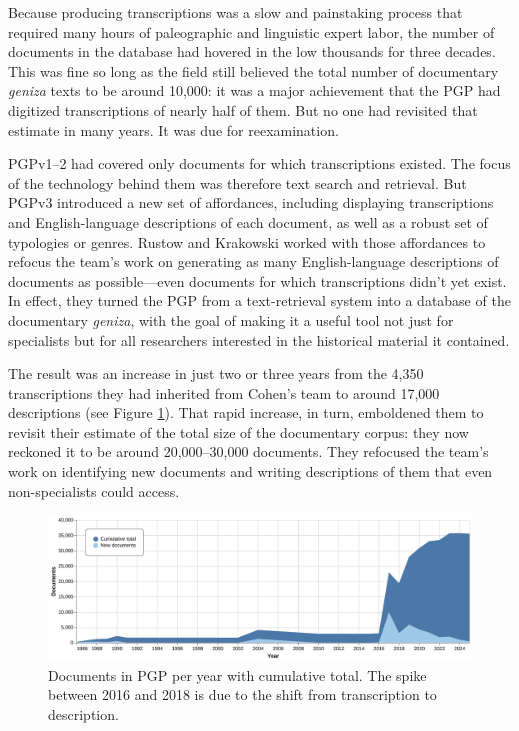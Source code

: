 \documentclass{article}
\begin{document}
Because producing transcriptions was a slow and painstaking process that required many hours of paleographic and linguistic expert labor, the number of documents in the database had hovered in the low thousands for three decades. This was fine so long as the field still believed the total number of documentary \textit{geniza} texts to be around 10,000: it was a major achievement that the PGP had digitized transcriptions of nearly half of them. But no one had revisited that estimate in many years. It was due for reexamination. 

PGPv1–2 had covered only documents for which transcriptions existed. The focus of the technology behind them was therefore text search and retrieval. But PGPv3 introduced a new set of affordances, including displaying transcriptions and English-language descriptions of each document, as well as a robust set of typologies or genres. Rustow and Krakowski worked with those affordances to refocus the team’s work on generating as many English-language descriptions of documents as possible—even documents for which transcriptions didn’t yet exist. In effect, they turned the PGP from a text-retrieval system into a database of the documentary \textit{geniza}, with the goal of making it a useful tool not just for specialists but for all researchers interested in the historical material it contained. 

The result was an increase in just two or three years from the 4,350 transcriptions they had inherited from Cohen’s team to around 17,000 descriptions (see Figure \ref{fig:documents-over-time}). That rapid increase, in turn, emboldened them to revisit their estimate of the total size of the documentary corpus: they now reckoned it to be around 20,000–30,000 documents. They refocused the team’s work on identifying new documents and writing descriptions of them that even non-specialists could access.

\begin{figure}[!htb]
\includegraphics[width=\textwidth]{charts/docs_over_time.pdf}
\centering
\caption{Documents in PGP per year with cumulative total. The spike between 2016 and 2018 is due to the shift from transcription to description.}
\label{fig:documents-over-time}
\end{figure}
\end{document}
